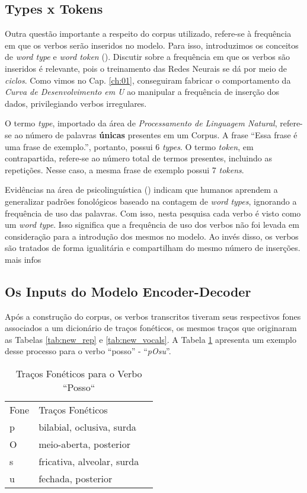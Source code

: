 \subsection{Types x Tokens}
Outra questão importante a respeito do corpus utilizado, refere-se à frequência em que os verbos serão inseridos no modelo. Para isso, introduzimos os conceitos de \textit{word type} e \textit{word token} (\cite{Manning:1999}). Discutir sobre a frequência em que os verbos são inseridos é relevante, pois o treinamento das Redes Neurais se dá por meio de \textit{ciclos}. Como vimos no Cap. \ref{ch:01}, \cite{rumelhart:1986} conseguiram fabricar o comportamento da \textit{Curva de Desenvolvimento em U} ao manipular a frequência de inserção dos dados, privilegiando verbos irregulares. 

O termo \textit{type}, importado da área de \textit{Processamento de Linguagem Natural}, refere-se ao número de palavras \textbf{únicas} presentes em um Corpus. A frase “Essa frase é uma frase de exemplo.”, portanto, possui 6 \textit{types}. O termo \textit{token}, em contrapartida, refere-se ao número total de termos presentes, incluindo as repetições. Nesse caso, a mesma frase de exemplo possui 7 \textit{tokens}. 

Evidências na área de psicolinguística (\cite{Bybee:1995,janet:2018}) indicam que humanos aprendem a generalizar padrões fonológicos baseado na contagem de \textit{word types}, ignorando a frequência de uso das palavras. Com isso, nesta pesquisa cada verbo é visto como um \textit{word type}. Isso significa que a frequência de uso dos verbos não foi levada em consideração para a introdução dos mesmos no modelo. Ao invés disso, os verbos são tratados de forma igualitária e compartilham do mesmo número de inserções.\\

mais infos

\subsection{Os Inputs do Modelo Encoder-Decoder}
\label{sec:inputs}

Após a construção do corpus, os verbos transcritos tiveram seus respectivos fones associados a um dicionário de traços fonéticos, os mesmos traços que originaram as Tabelas \ref{tab:new_rep} e \ref{tab:new_vocals}. A Tabela \ref{tab:pOsu} apresenta um exemplo desse processo para o verbo “posso” - “\textit{pOsu}”. 

\begin{table}[H]
\begin{center}
\begin{tabular}{lll}
Fone & Traços Fonéticos &  \\ \cline{1-2}
p & bilabial, oclusiva, surda &  \\
O & meio-aberta, posterior &  \\
s & fricativa, alveolar, surda &  \\
u & fechada, posterior & 
\end{tabular}
\end{center}
\caption{Traços Fonéticos para o Verbo “Posso“}
\label{tab:pOsu}
\end{table}

